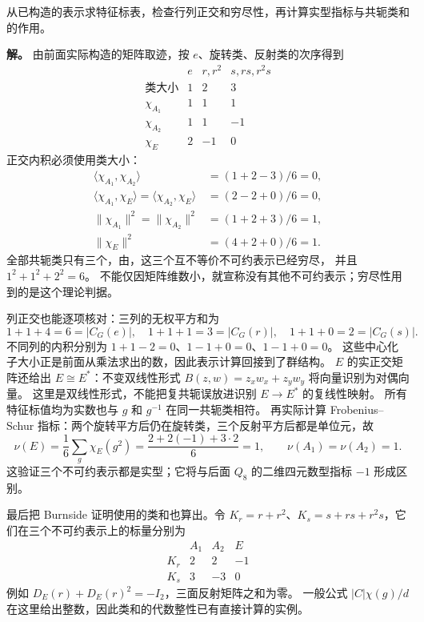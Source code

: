 \begin{workedexample}[特征标的行列正交与完整性]
\label{ex:d3-comprehensive-character}
从已构造的表示求特征标表，检查行列正交和穷尽性，再计算实型指标与共轭类和的作用。

\textbf{解。} 由前面实际构造的矩阵取迹，按 $e$、旋转类、反射类的次序得到
\[
\begin{array}{c|rrr}
 &e&r,r^2&s,rs,r^2s\\\hline
\text{类大小}&1&2&3\\
\chi_{A_1}&1&1&1\\
\chi_{A_2}&1&1&-1\\
\chi_E&2&-1&0
\end{array}
\]
正交内积必须使用类大小：
\begin{align*}
\langle\chi_{A_1},\chi_{A_2}\rangle&=(1+2-3)/6=0,\\
\langle\chi_{A_1},\chi_E\rangle
=\langle\chi_{A_2},\chi_E\rangle&=(2-2+0)/6=0,\\
\|\chi_{A_1}\|^2=\|\chi_{A_2}\|^2&=(1+2+3)/6=1,\\
\|\chi_E\|^2&=(4+2+0)/6=1.
\end{align*}
全部共轭类只有三个，由，这三个互不等价不可约表示已经穷尽，
并且 $1^2+1^2+2^2=6$。
不能仅因矩阵维数小，就宣称没有其他不可约表示；穷尽性用到的是这个理论判据。

列正交也能逐项核对：三列的无权平方和为
\[
1+1+4=6=|C_G(e)|,\quad
1+1+1=3=|C_G(r)|,\quad
1+1+0=2=|C_G(s)|.
\]
不同列的内积分别为 $1+1-2=0$、$1-1+0=0$、$1-1+0=0$。
这些中心化子大小正是前面从乘法求出的数，因此表示计算回接到了群结构。
$E$ 的实正交矩阵还给出 $E\cong E^*$：不变双线性形式
$B(z,w)=z_xw_x+z_yw_y$ 将向量识别为对偶向量。
这里是双线性形式，不能把复共轭误放进识别 $E\to E^*$ 的复线性映射。
所有特征标值均为实数也与 $g$ 和 $g^{-1}$ 在同一共轭类相符。
再实际计算 Frobenius--Schur 指标：两个旋转平方后仍在旋转类，三个反射平方后都是单位元，故
\[
\nu(E)=\frac16\sum_g\chi_E(g^2)=\frac{2+2(-1)+3\cdot2}{6}=1,
\qquad \nu(A_1)=\nu(A_2)=1.
\]
这验证三个不可约表示都是实型；它将与后面 $Q_8$ 的二维四元数型指标 $-1$ 形成区别。

最后把 Burnside 证明使用的类和也算出。令
$K_r=r+r^2$、$K_s=s+rs+r^2s$，它们在三个不可约表示上的标量分别为
\[
\begin{array}{c|rrr}
 &A_1&A_2&E\\\hline
K_r&2&2&-1\\
K_s&3&-3&0
\end{array}
\]
例如 $D_E(r)+D_E(r)^2=-I_2$，三面反射矩阵之和为零。
一般公式 $|C|\chi(g)/d$ 在这里给出整数，因此类和的代数整性已有直接计算的实例。
\end{workedexample}

